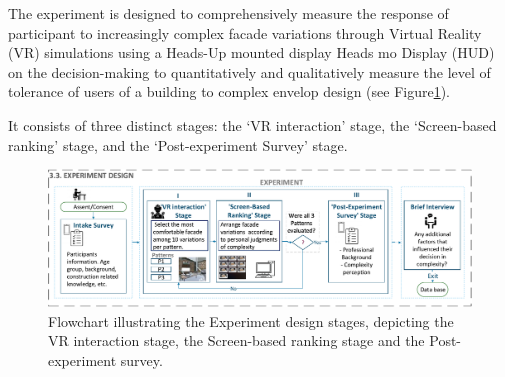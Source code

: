 %    

The experiment is designed to comprehensively measure the response of participant to increasingly complex facade variations through Virtual Reality (VR) simulations using a Heads-Up mounted display Heads mo Display (HUD) on the decision-making to quantitatively and qualitatively measure the level of tolerance of users of a building to complex envelop design (see Figure\ref{fig:ExperimentFlowchart}).

It consists of three distinct stages: the `VR interaction' stage, the `Screen-based ranking' stage, and the `Post-experiment Survey' stage.

    \begin{figure}[htb]
      \centering
      \includegraphics[width= \linewidth, trim=0 0 0 0, clip]{Images/FlowchartExperiment}
      \caption{Flowchart illustrating the Experiment design stages, depicting the VR interaction stage, the Screen-based ranking stage and the Post-experiment survey.}
      \label{fig:ExperimentFlowchart}
    \end{figure}